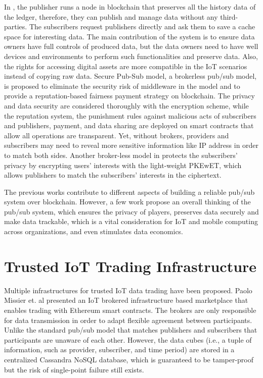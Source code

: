 \begin{spacing}{2.0}
In \cite{userCentricData}, the publisher runs a node in blockchain that preserves all the history data of the ledger, therefore, they can publish and manage data without any third-parties. The subscribers request publishers directly and ask them to save a cache space for interesting data. The main contribution of the system is to ensure data owners have full controls of produced data, but the data owners need to have well devices and environments to perform such functionalities and preserve data. Also, the rights for accessing digital assets are more compatible in the IoT scenarios instead of copying raw data. Secure Pub-Sub model\cite{SPS}, a brokerless pub/sub model, is proposed to eliminate the security risk of middleware in the model and to provide a reputation-based fairness payment strategy on blockchain. The privacy and data security are considered thoroughly with the encryption scheme, while the reputation system, the punishment rules against malicious acts of subscribers and publishers, payment, and data sharing are deployed on smart contracts that allow all operations are transparent. Yet, without brokers, providers and subscribers may need to reveal more sensitive information like IP address in order to match both sides. Another broker-less model in \cite{PrivacyPreservPubSub} protects the subscribers' privacy by encrypting users' interests with the light-weight PKEwET\cite{PKEwET}, which allows publishers to match the subscribers' interests in the ciphertext.

The previous works contribute to different aspects of building a reliable pub/sub system over blockchain. However, a few work propose an overall thinking of the pub/sub system, which ensures the privacy of players, preserves data securely and make data trackable, which is a vital consideration for IoT and mobile computing across organizations, and even stimulates data economics.

\section{Trusted IoT Trading Infrastructure}
Multiple infrastructures for trusted IoT data trading have been proposed. Paolo Missier et. al\cite{MindMyValue} presented an IoT brokered infrastructure based marketplace that enables trading with Ethereum smart contracts. The brokers are only responsible for data transmission in order to adapt flexible agreement between participants. Unlike the standard pub/sub model that matches publishers and subscribers that participants are unaware of each other. However, the data cubes (i.e., a tuple of information, such as provider, subscriber, and time period) are stored in a centralized Cassandra NoSQL database, which is guaranteed to be tamper-proof but the risk of single-point failure still exists.


\end{spacing}
